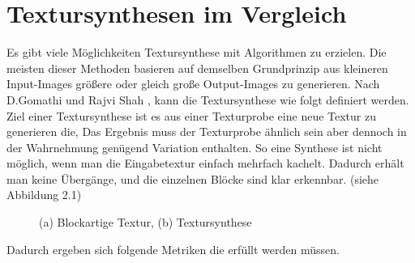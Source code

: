 \documentclass[12pt, a4paper,twoside,openright]{report}
\begin{document}
\chapter{Textursynthesen im Vergleich}

Es gibt viele Möglichkeiten Textursynthese mit Algorithmen zu erzielen.
Die meisten dieser Methoden basieren auf demselben Grundprinzip aus kleineren Input-Images größere oder gleich große Output-Images zu generieren.
Nach D.Gomathi und Rajvi Shah \cite[S.1]{GomathiShah2009}, kann die Textursynthese wie folgt definiert werden.
\newline
Ziel einer Textursynthese ist es aus einer Texturprobe eine neue Textur zu generieren die, 
Das Ergebnis muss der Texturprobe ähnlich sein aber dennoch in der Wahrnehmung genügend Variation enthalten.
So eine Synthese ist nicht möglich, wenn man die Eingabetextur einfach mehrfach kachelt.
Dadurch erhält man keine  Übergänge, und die einzelnen Blöcke sind klar erkennbar. {(siehe Abbildung 2.1)}

\begin{figure}[H]
    \centering
    \qquad
    \caption{(a) Blockartige Textur, (b) Textursynthese}%
\end{figure}

\noindent Dadurch ergeben sich folgende Metriken die erfüllt werden müssen.
\end{document}

